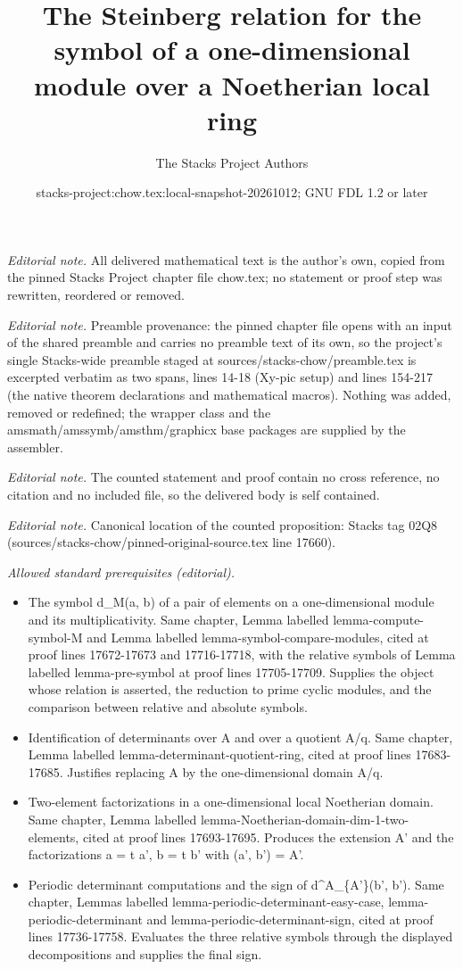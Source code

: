 \documentclass[10pt,a4paper]{amsart}
\title{The Steinberg relation for the symbol of a one-dimensional module over a Noetherian local ring}
\author{The Stacks Project Authors}
\date{stacks-project:chow.tex:local-snapshot-20261012; GNU FDL 1.2 or later}
\theoremstyle{plain}
\theoremstyle{definition}
\theoremstyle{remark}
\numberwithin{equation}{subsection}
\begin{document}
\maketitle
\noindent\textit{Editorial note.} All delivered mathematical text is the author's own, copied from the pinned Stacks Project chapter file chow.tex; no statement or proof step was rewritten, reordered or removed.\par\medskip
\noindent\textit{Editorial note.} Preamble provenance: the pinned chapter file opens with an input of the shared preamble and carries no preamble text of its own, so the project's single Stacks-wide preamble staged at sources/stacks-chow/preamble.tex is excerpted verbatim as two spans, lines 14-18 (Xy-pic setup) and lines 154-217 (the native theorem declarations and mathematical macros). Nothing was added, removed or redefined; the wrapper class and the amsmath/amssymb/amsthm/graphicx base packages are supplied by the assembler.\par\medskip
\noindent\textit{Editorial note.} The counted statement and proof contain no cross reference, no citation and no included file, so the delivered body is self contained.\par\medskip
\noindent\textit{Editorial note.} Canonical location of the counted proposition: Stacks tag 02Q8 (sources/stacks-chow/pinned-original-source.tex line 17660).\par\medskip
\noindent\textit{Allowed standard prerequisites (editorial).}\begin{itemize}
\item The symbol d\_M(a, b) of a pair of elements on a one-dimensional module and its multiplicativity. Same chapter, Lemma labelled lemma-compute-symbol-M and Lemma labelled lemma-symbol-compare-modules, cited at proof lines 17672-17673 and 17716-17718, with the relative symbols of Lemma labelled lemma-pre-symbol at proof lines 17705-17709. Supplies the object whose relation is asserted, the reduction to prime cyclic modules, and the comparison between relative and absolute symbols.
\item Identification of determinants over A and over a quotient A/q. Same chapter, Lemma labelled lemma-determinant-quotient-ring, cited at proof lines 17683-17685. Justifies replacing A by the one-dimensional domain A/q.
\item Two-element factorizations in a one-dimensional local Noetherian domain. Same chapter, Lemma labelled lemma-Noetherian-domain-dim-1-two-elements, cited at proof lines 17693-17695. Produces the extension A' and the factorizations a = t a', b = t b' with (a', b') = A'.
\item Periodic determinant computations and the sign of d\textasciicircum{}A\_\{A'\}(b', b'). Same chapter, Lemmas labelled lemma-periodic-determinant-easy-case, lemma-periodic-determinant and lemma-periodic-determinant-sign, cited at proof lines 17736-17758. Evaluates the three relative symbols through the displayed decompositions and supplies the final sign.
\end{itemize}\medskip
\end{document}
